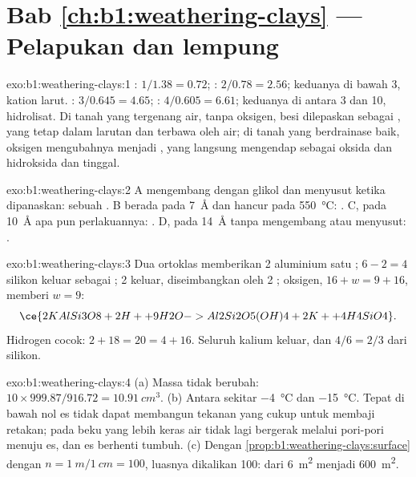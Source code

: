 \section*{Bab \ref{ch:b1:weathering-clays} --- Pelapukan dan lempung}

\begin{solution}{exo:b1:weathering-clays:1}
: $1/1.38 = 0.72$; : $2/0.78 = 2.56$; keduanya di bawah 3, kation
larut. : $3/0.645 = 4.65$; : $4/0.605 = 6.61$; keduanya
di antara 3 dan 10, hidrolisat. Di tanah yang tergenang air, tanpa oksigen, besi
dilepaskan sebagai , yang tetap dalam larutan dan terbawa oleh air; di
tanah yang berdrainase baik, oksigen mengubahnya menjadi , yang langsung
mengendap sebagai oksida dan hidroksida dan tinggal.
\end{solution}

\begin{solution}{exo:b1:weathering-clays:2}
A mengembang dengan glikol dan menyusut ketika dipanaskan: sebuah . B
berada pada \SI{7}{\angstrom} dan hancur pada \SI{550}{\celsius}: . C,
pada \SI{10}{\angstrom} apa pun perlakuannya: . D, pada \SI{14}{\angstrom}
tanpa mengembang atau menyusut: .
\end{solution}

\begin{solution}{exo:b1:weathering-clays:3}
Dua ortoklas memberikan 2 aluminium satu ; $6 - 2 = 4$ silikon keluar
sebagai ; 2  keluar, diseimbangkan oleh 2 ; oksigen,
$16 + w = 9 + 16$, memberi $w = 9$:
\[
  \ce{2 KAlSi3O8 + 2 H+ + 9 H2O -> Al2Si2O5(OH)4 + 2 K+ + 4 H4SiO4}.
\]
Hidrogen cocok: $2 + 18 = 20 = 4 + 16$. Seluruh kalium keluar, dan $4/6 =
2/3$ dari silikon.
\end{solution}

\begin{solution}{exo:b1:weathering-clays:4}
(a) Massa tidak berubah: $10 \times 999.87/916.72 = \qty{10.91}{cm^3}$.
(b) Antara sekitar \qty{-4}{\celsius} dan \qty{-15}{\celsius}. Tepat di bawah nol
es tidak dapat membangun tekanan yang cukup untuk membaji retakan; pada beku yang
lebih keras air tidak lagi bergerak melalui pori-pori menuju es, dan es berhenti
tumbuh. (c) Dengan
\cref{prop:b1:weathering-clays:surface} dengan $n = \qty{1}{m}/\qty{1}{cm} = 100$,
luasnya dikalikan 100: dari \qty{6}{m^2} menjadi \qty{600}{m^2}.
\end{solution}

